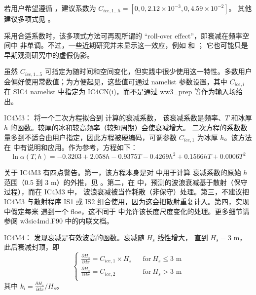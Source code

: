 \noindent
若用户希望遵循 \cite{art:MBK14}，建议系数为
${C_{ice,1...5}}=[0, 0, 2.12\times 10^{-3}, 0, 4.59\times 10^{-2}]$。
其他建议多项式见 \cite{rep:RMK18}。

采用合适系数时，该多项式方法可再现所谓的 ``roll-over effect''，即衰减在频率空间中
非单调。不过，一些近期研究并未显示这一效应，例如 \cite{art:RTS16} 和 \cite{art:LK17}；
它也可能只是早期观测研究中的虚假伪影。

虽然 ${C_{ice,1...5}}$ 可指定为随时间和空间变化，但实践中很少使用这一特性。多数用户
会偏好使用常数值；为方便起见，这些值可通过 namelist 参数设置，其中 $C_{ice,i}$
在 {\code SIC4} namelist 中指定为 {\code IC4CN(i)}，而不是通过 {\file ww3\_prep}
等作为输入场给出。

{\code IC4M3}：\cite{art:HT15} 将一个二次方程拟合到 \cite{art:KM08} 计算的衰减系数，
该衰减系数是频率、$T$ 和冰厚 $h$ 的函数。较厚的冰和较高频率（较短周期）会使衰减增大。
二次方程的系数数量多到不适合由用户指定，因此方程被硬编码，可调参数 ${C_{ice,1}}$
为冰厚 $h$。该方法在 \cite{rep:CR17} 中有说明和应用。作为参考，方程如下：
\begin{equation}\label{eq:ice3}
  {\ln{\alpha(T,h)}} = -0.3203 + 2.058h - 0.9375T - 0.4269h^2 + 0.1566hT + 0.0006T^2
\end{equation}

\noindent
关于 {\code IC4M3} 有四点警告。第一，该方程本身是对 \cite{art:KM08} 中用于计算
衰减系数的原始 $h$ 范围（0.5 到 3 m）的外推，见 \cite{art:HT15}。第二，在
\cite{art:KM08} 中，预测的波浪衰减基于散射（保守过程），而在 {\code IC4M3} 中，
波浪衰减被当作耗散（非保守）处理。第三，不建议把 {\code IC4M3} 与散射程序
{\code IS1} 或 {\code IS2} 组合使用，因为这会把散射重复计入。第四，实现中假定每米
遇到一个 floe，这不同于 \cite{art:HT15} 中允许该长度尺度变化的处理。更多细节请参阅
{\file w3sic4md.F90} 中的内联文档。

{\code IC4M4}：\cite{art:Ko14} 发现衰减是有效波高的函数。衰减随 ${H_s}$ 线性增大，
直到 ${H_s} = 3$ m，此后衰减封顶，即
\begin{equation}
\left \{
\begin{array}{llrcl}
{\frac{\partial H_s}{\partial dx}} = {C_{ice,1}}\times {H_s}   & & \text{for} \> {H_s} \leq 3 \text{ m}  \\
{\frac{\partial H_s}{\partial dx}} = {C_{ice,2}}               & & \text{for} \> {H_s} > 3 \text{ m}     \\
\end{array} \right .
\end{equation}
其中 {$k_i=\frac{\partial H_s}{\partial dx}/H_s$}。

